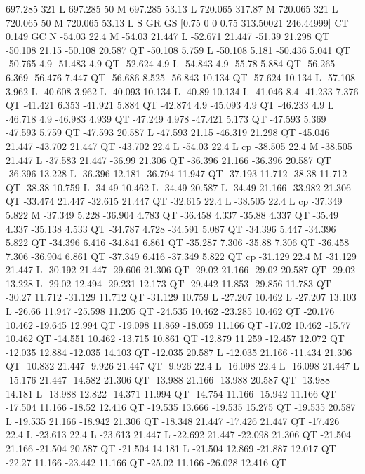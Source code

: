 697.285 321 L
697.285 50 M
697.285 53.13 L
720.065 317.87 M
720.065 321 L
720.065 50 M
720.065 53.13 L
S
GR
GS
[0.75 0 0 0.75 313.50021 246.44999] CT
0.149 GC
N
-54.03 22.4 M
-54.03 21.447 L
-52.671 21.447 -51.39 21.298 QT
-50.108 21.15 -50.108 20.587 QT
-50.108 5.759 L
-50.108 5.181 -50.436 5.041 QT
-50.765 4.9 -51.483 4.9 QT
-52.624 4.9 L
-54.843 4.9 -55.78 5.884 QT
-56.265 6.369 -56.476 7.447 QT
-56.686 8.525 -56.843 10.134 QT
-57.624 10.134 L
-57.108 3.962 L
-40.608 3.962 L
-40.093 10.134 L
-40.89 10.134 L
-41.046 8.4 -41.233 7.376 QT
-41.421 6.353 -41.921 5.884 QT
-42.874 4.9 -45.093 4.9 QT
-46.233 4.9 L
-46.718 4.9 -46.983 4.939 QT
-47.249 4.978 -47.421 5.173 QT
-47.593 5.369 -47.593 5.759 QT
-47.593 20.587 L
-47.593 21.15 -46.319 21.298 QT
-45.046 21.447 -43.702 21.447 QT
-43.702 22.4 L
-54.03 22.4 L
cp
-38.505 22.4 M
-38.505 21.447 L
-37.583 21.447 -36.99 21.306 QT
-36.396 21.166 -36.396 20.587 QT
-36.396 13.228 L
-36.396 12.181 -36.794 11.947 QT
-37.193 11.712 -38.38 11.712 QT
-38.38 10.759 L
-34.49 10.462 L
-34.49 20.587 L
-34.49 21.166 -33.982 21.306 QT
-33.474 21.447 -32.615 21.447 QT
-32.615 22.4 L
-38.505 22.4 L
cp
-37.349 5.822 M
-37.349 5.228 -36.904 4.783 QT
-36.458 4.337 -35.88 4.337 QT
-35.49 4.337 -35.138 4.533 QT
-34.787 4.728 -34.591 5.087 QT
-34.396 5.447 -34.396 5.822 QT
-34.396 6.416 -34.841 6.861 QT
-35.287 7.306 -35.88 7.306 QT
-36.458 7.306 -36.904 6.861 QT
-37.349 6.416 -37.349 5.822 QT
cp
-31.129 22.4 M
-31.129 21.447 L
-30.192 21.447 -29.606 21.306 QT
-29.02 21.166 -29.02 20.587 QT
-29.02 13.228 L
-29.02 12.494 -29.231 12.173 QT
-29.442 11.853 -29.856 11.783 QT
-30.27 11.712 -31.129 11.712 QT
-31.129 10.759 L
-27.207 10.462 L
-27.207 13.103 L
-26.66 11.947 -25.598 11.205 QT
-24.535 10.462 -23.285 10.462 QT
-20.176 10.462 -19.645 12.994 QT
-19.098 11.869 -18.059 11.166 QT
-17.02 10.462 -15.77 10.462 QT
-14.551 10.462 -13.715 10.861 QT
-12.879 11.259 -12.457 12.072 QT
-12.035 12.884 -12.035 14.103 QT
-12.035 20.587 L
-12.035 21.166 -11.434 21.306 QT
-10.832 21.447 -9.926 21.447 QT
-9.926 22.4 L
-16.098 22.4 L
-16.098 21.447 L
-15.176 21.447 -14.582 21.306 QT
-13.988 21.166 -13.988 20.587 QT
-13.988 14.181 L
-13.988 12.822 -14.371 11.994 QT
-14.754 11.166 -15.942 11.166 QT
-17.504 11.166 -18.52 12.416 QT
-19.535 13.666 -19.535 15.275 QT
-19.535 20.587 L
-19.535 21.166 -18.942 21.306 QT
-18.348 21.447 -17.426 21.447 QT
-17.426 22.4 L
-23.613 22.4 L
-23.613 21.447 L
-22.692 21.447 -22.098 21.306 QT
-21.504 21.166 -21.504 20.587 QT
-21.504 14.181 L
-21.504 12.869 -21.887 12.017 QT
-22.27 11.166 -23.442 11.166 QT
-25.02 11.166 -26.028 12.416 QT
